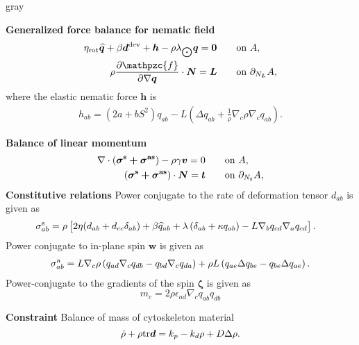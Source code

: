 \begin{center}
	\begin{mybox}{gray}{  }
		
		\textbf{Generalized force balance for nematic field}
		\begin{align}   \label{eq_box_A_6}
			\eta_{\text{rot}} \widehat{\bm{q}}  +\beta  \bm{d}^{\textup{dev}}  +  \bm{h} - \rho\lambda_{\bigodot} \bm{q} = \bm{0} & \qquad \text{on } A,
			\\
			\rho \frac{\partial \mathpzc{f}}{\partial \nabla \bm{q}} \cdot\bm{N} = \bm{L} &  \qquad \text{on } \partial_{N_{\bm{L}}} A,  \nonumber
		\end{align}
		where the elastic nematic force $\bm{h}$ is 
		\begin{align}  \label{eq_box_A_7}
			h_{ab} =  ( 2a+bS^2 ) q_{ab} -  L\left(\Delta q_{ab} + \frac{1}{\rho} \nabla_c \rho \nabla_c q_{ab}\right).
		\end{align}
		
		\textbf{Balance of linear momentum}
		\begin{align}  \label{eq_box_A_1}
			 \nabla \cdot \left(\bm {\sigma^{\rm s} + \sigma^{\rm as} } \right)  -\rho \gamma  \bm{v}=0 & \qquad \text{on } A,  \\
		\left(\bm {\sigma^{\rm s} + \sigma^{\rm as} } \right)\cdot\bm{N}= \bm{t} 	& \qquad \text{on } \partial_{N_{\bm{t}}} A,  \nonumber
		\end{align}
		\textbf{Constitutive relations}
		\newline
		Power conjugate to the rate of deformation tensor $d_{ab}$ is given as
		\begin{align}  \label{eq_box_A_2}
			& \sigma^{\rm s}_{ab} = \rho \left[2\eta  (d_{ab}+d_{cc} \delta_{ab}) + \beta  \widehat{q}_{ab}  + \lambda \left(\delta_{ab} + \kappa q_{ab}\right) -L\nabla_b q_{cd} \nabla_a q_{cd}\right].
		\end{align}
	Power conjugate to in-plane spin $\bm{w}$ is given as
	\begin{align}  
		\sigma^{\rm a}_{ab} = L \nabla_c \rho \left( q_{ad} \nabla_c q_{db}  - q_{bd} \nabla_c q_{da}  \right) + \rho L  \left(q_{ae}\Delta q_{be}  -q_{be}  \Delta q_{ae}  \right).
	\end{align}
	Power-conjugate to the gradients of the spin $\bm{\zeta}$ is given as
        \begin{equation} \label{eq_box_A_5}
        	m_c = 2 \rho \epsilon_{ad} \nabla_c q_{ab} q_{db} 
        \end{equation}


		\textbf{Constraint}
		\newline
		Balance of mass of cytoskeleton material
\begin{equation} 
	\dot{\rho} + \rho {\rm tr} \bm{d} = k_p - k_d \rho + D \Delta \rho.
\end{equation}

\end{mybox} 
\end{center}
